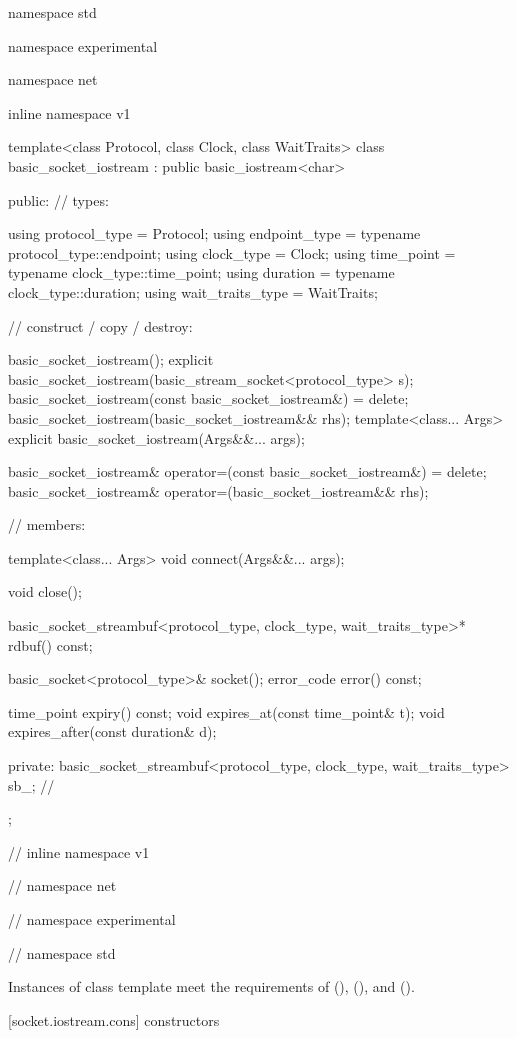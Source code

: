 \begin{codeblock}
namespace std {
namespace experimental {
namespace net {
inline namespace v1 {

  template<class Protocol, class Clock, class WaitTraits>
  class basic_socket_iostream : public basic_iostream<char>
  {
  public:
    // types:

    using protocol_type = Protocol;
    using endpoint_type = typename protocol_type::endpoint;
    using clock_type = Clock;
    using time_point = typename clock_type::time_point;
    using duration = typename clock_type::duration;
    using wait_traits_type = WaitTraits;

    // construct / copy / destroy:

    basic_socket_iostream();
    explicit basic_socket_iostream(basic_stream_socket<protocol_type> s);
    basic_socket_iostream(const basic_socket_iostream&) = delete;
    basic_socket_iostream(basic_socket_iostream&& rhs);
    template<class... Args>
      explicit basic_socket_iostream(Args&&... args);

    basic_socket_iostream& operator=(const basic_socket_iostream&) = delete;
    basic_socket_iostream& operator=(basic_socket_iostream&& rhs);

    // members:

    template<class... Args> void connect(Args&&... args);

    void close();

    basic_socket_streambuf<protocol_type, clock_type, wait_traits_type>* rdbuf() const;

    basic_socket<protocol_type>& socket();
    error_code error() const;

    time_point expiry() const;
    void expires_at(const time_point& t);
    void expires_after(const duration& d);

  private:
    basic_socket_streambuf<protocol_type, clock_type, wait_traits_type> sb_; // \expos
  };

} // inline namespace v1
} // namespace net
} // namespace experimental
} // namespace std
\end{codeblock}

\pnum
Instances of class template  meet the requirements of  (),  (), and  ().


[socket.iostream.cons]{ constructors}

